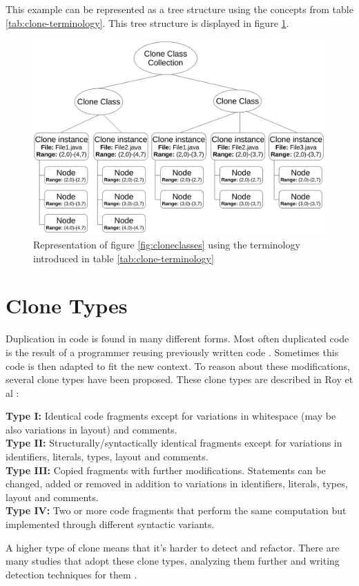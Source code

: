 This example can be represented as a tree structure using the concepts from table \ref{tab:clone-terminology}. This tree structure is displayed in figure \ref{fig:terminologyexample}.

\begin{figure}[H]
  \includegraphics[width=1\columnwidth]{img/TerminologyExample}
  \caption{Representation of figure \ref{fig:cloneclasses} using the terminology introduced in table \ref{tab:clone-terminology}}
  \label{fig:terminologyexample}
\end{figure}

\section{Clone Types} \label{chap:backgroundclonetypes}
Duplication in code is found in many different forms. Most often duplicated code is the result of a programmer reusing previously written code \cite{haefliger2008code, baxter1998clone}. Sometimes this code is then adapted to fit the new context. To reason about these modifications, several clone types have been proposed. These clone types are described in Roy et al \cite{roy2007survey}:
\begin{displayquote}
\textbf{Type I:} Identical code fragments except for variations in whitespace (may be also variations in layout) and comments.\\
\textbf{Type II:} Structurally/syntactically identical fragments except for variations in identifiers, literals, types, layout and comments.\\
\textbf{Type III:} Copied fragments with further modifications. Statements can be changed, added or removed in addition to variations in identifiers, literals, types, layout and comments.\\
\textbf{Type IV:} Two or more code fragments that perform the same computation but implemented through different syntactic variants.
\end{displayquote}
A higher type of clone means that it's harder to detect and refactor. There are many studies that adopt these clone types, analyzing them further and writing detection techniques for them \cite{sajnani2016sourcerercc, kodhai2010detection, van2019novel}.

